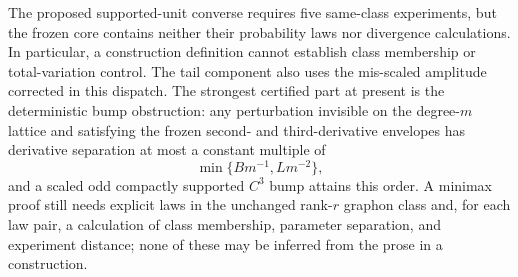 The proposed supported-unit converse requires five same-class experiments, but the frozen core contains neither their probability laws nor divergence calculations.  In particular, a construction definition cannot establish class membership or total-variation control.  The tail component also uses the mis-scaled amplitude corrected in this dispatch.  The strongest certified part at present is the deterministic bump obstruction: any perturbation invisible on the degree-\(m\) lattice and satisfying the frozen second- and third-derivative envelopes has derivative separation at most a constant multiple of
\[
 \min\{Bm^{-1},Lm^{-2}\},
\]
and a scaled odd compactly supported \(C^3\) bump attains this order.  A minimax proof still needs explicit laws in the unchanged rank-\(r\) graphon class and, for each law pair, a calculation of class membership, parameter separation, and experiment distance; none of these may be inferred from the prose in a construction.